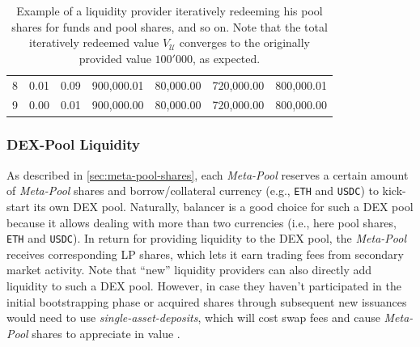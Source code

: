 \documentclass[a4paper]{article}
\begin{document}
\begin{table}
\begin{tabular}{rrrrrrr}
8                                & 0.01                                     & 0.09                                      & 900,000.01                                     & 80,000.00                                & 720,000.00                                 & 800,000.01                          \\
9                                & 0.00                                     & 0.01                                      & 900,000.00                                     & 80,000.00                                & 720,000.00                                 & 800,000.00                         
\end{tabular}
\caption{\label{tab:meta-pool-shares}Example of a liquidity provider iteratively redeeming his pool shares for funds and pool shares, and so on. Note that the total iteratively redeemed value $V_{\mathcal{U}}$ converges to the originally provided value $100'000$, as expected.}
\end{table}


\subsubsection{DEX-Pool Liquidity}
\label{sec:dex}
As described in \cref{sec:meta-pool-shares}, each \emph{Meta-Pool} reserves a certain amount of \emph{Meta-Pool} shares and borrow/collateral currency (e.g., \verb|ETH| and \verb|USDC|) to kick-start its own DEX pool. Naturally, balancer is a good choice for such a DEX pool because it allows dealing with more than two currencies (i.e., here pool shares, \verb|ETH| and \verb|USDC|). In return for providing liquidity to the DEX pool, the \emph{Meta-Pool} receives corresponding LP shares, which lets it earn trading fees from secondary market activity. Note that ``new'' liquidity providers can also directly add liquidity to such a DEX pool. However, in case they haven't participated in the initial bootstrapping phase or acquired shares through subsequent new issuances would need to use \emph{single-asset-deposits}, which will cost swap fees and cause \emph{Meta-Pool} shares to appreciate in value \cite{balancer}. 
\end{document}
